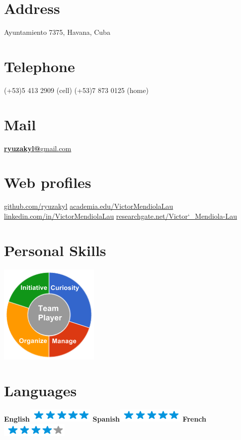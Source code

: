 \documentclass[]{friggeri-cv}
\begin{document}
      

\begin{aside}
  \section{Address}
    Ayuntamiento 7375, 
    Havana, Cuba
    ~
  \section{Telephone}
    (+53)5 413 2909 (cell)
  	(+53)7 873 0125 (home)
    ~
  \section{Mail}
    \href{mailto:ryuzakyl@gmail.com}{\textbf{ryuzakyl@}gmail.com}
    ~
  \section{Web profiles}
    \href{https://github.com/ryuzakyl}{{\scriptsize github.com/ryuzakyl}}
    \href{https://independent.academia.edu/VictorMendiolaLau}{{\scriptsize academia.edu/VictorMendiolaLau}}
    \href{https://www.linkedin.com/in/VictorMendiolaLau}{{\scriptsize linkedin.com/in/VictorMendiolaLau}}
	\href{https://www.researchgate.net/profile/Victor_Mendiola-Lau}{{\scriptsize researchgate.net/Victor\char`_Mendiola-Lau}}
    ~
  \section{Personal Skills}
    \includegraphics[scale=0.62]{img/personal.png}
    ~
  \section{Languages}
  	\textbf{English}\includegraphics[scale=0.40]{img/5stars.png}
  	\textbf{Spanish}\includegraphics[scale=0.40]{img/5stars.png}
    \textbf{French}\includegraphics[scale=0.40]{img/4stars.png}
	~

\end{aside}
\end{document}
